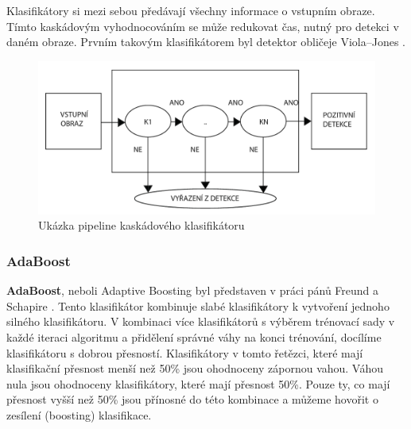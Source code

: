 Klasifikátory si mezi sebou předávají všechny informace o vstupním obraze. Tímto kaskádovým vyhodnocováním se může redukovat čas, nutný pro detekci v daném obraze. Prvním takovým klasifikátorem byl detektor obličeje Viola--Jones \cite{violajones}.  
\begin{figure}[H]
\centering
\includegraphics[width=.7\linewidth]{figures/cascadeClass.pdf}
\caption{Ukázka pipeline kaskádového klasifikátoru}
\label{fig:ccpipeline}
\end{figure}

\subsubsection*{AdaBoost}
\textbf{AdaBoost}, neboli Adaptive Boosting byl představen v práci pánů Freund a Schapire \cite{adaboost}. Tento klasifikátor kombinuje slabé klasifikátory k vytvoření jednoho silného klasifikátoru. V kombinaci více klasifikátorů s výběrem trénovací sady v každé iteraci algoritmu a přidělení správné váhy na konci trénování, docílíme klasifikátoru s dobrou přesností. Klasifikátory v tomto řetězci, které mají klasifikační přesnost menší než 50\% jsou ohodnoceny zápornou vahou. Váhou nula jsou ohodnoceny klasifikátory, které mají přesnost 50\%. Pouze ty, co mají přesnost vyšší než 50\% jsou přínosné do této kombinace a můžeme hovořit o zesílení (boosting) klasifikace. 

